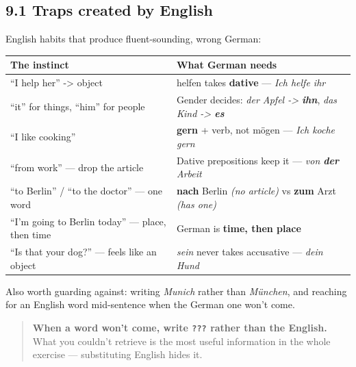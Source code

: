 \documentclass[
  11pt,
]{article}
\newcounter{none} %
\begin{document}
\subsection{9.1 Traps created by
English}\label{traps-created-by-english}

English habits that produce fluent-sounding, wrong German:

{\def\LTcaptype{none} %
\begin{longtable}[]{@{}
  >{\raggedright\arraybackslash}p{}
  >{\raggedright\arraybackslash}p{}@{}}
\toprule\noalign{}
\begin{minipage}[b]{\linewidth}\raggedright
The instinct
\end{minipage} & \begin{minipage}[b]{\linewidth}\raggedright
What German needs
\end{minipage} \\
\midrule\noalign{}
\endhead
\bottomrule\noalign{}
\endlastfoot
``I help her'' -\textgreater{} object & helfen takes \textbf{dative} ---
\emph{Ich helfe ihr} \\
``it'' for things, ``him'' for people & Gender decides: \emph{der Apfel
-\textgreater{} \textbf{ihn}}, \emph{das Kind -\textgreater{}
\textbf{es}} \\
``I like cooking'' & \textbf{gern} + verb, not mögen --- \emph{Ich koche
gern} \\
``from work'' --- drop the article & Dative prepositions keep it ---
\emph{von \textbf{der} Arbeit} \\
``to Berlin'' / ``to the doctor'' --- one word & \textbf{nach} Berlin
\emph{(no article)} vs \textbf{zum} Arzt \emph{(has one)} \\
``I'm going to Berlin today'' --- place, then time & German is
\textbf{time, then place} \\
``Is that your dog?'' --- feels like an object & \emph{sein} never takes
accusative --- \emph{dein Hund} \\
\end{longtable}
}

Also worth guarding against: writing \emph{Munich} rather than
\emph{München}, and reaching for an English word mid-sentence when the
German one won't come.

\begin{quote}
\textbf{When a word won't come, write \texttt{???} rather than the
English.} What you couldn't retrieve is the most useful information in
the whole exercise --- substituting English hides it.
\end{quote}
\end{document}
